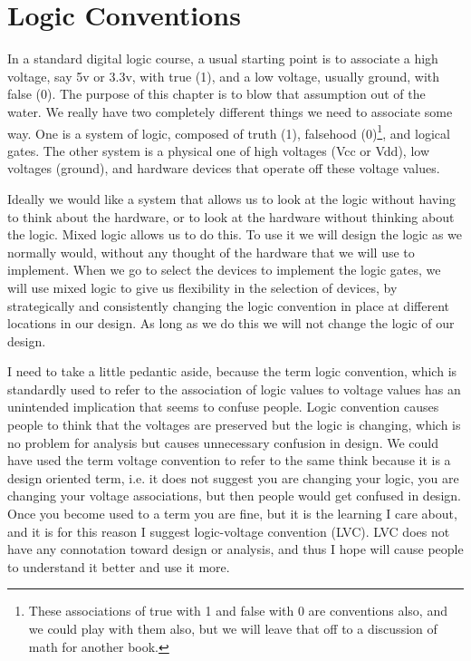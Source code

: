 \chapter{Logic Conventions}

In a standard digital logic course, a usual starting point is to associate a high voltage, say 5v or 3.3v, with true (1), and a low voltage, usually ground, with false (0).  The purpose of this chapter is to blow that assumption out of the water.  We really have two completely different things we need to associate some way.  One is a system of logic, composed of truth (1), falsehood (0)\footnote{These associations of true with 1 and false with 0 are conventions also, and we could play with them also, but we will leave that off to a discussion of math for another book.}, and logical gates.  The other system is a physical one of high voltages (Vcc or Vdd), low voltages (ground), and hardware devices that operate off these voltage values.

Ideally we would like a system that allows us to look at the logic without having to think about the hardware, or to look at the hardware without thinking about the logic.  Mixed logic allows us to do this.  To use it we will design the logic as we normally would, without any thought of the hardware that we will use to implement.  When we go to select the devices to implement the logic gates, we will use mixed logic to give us flexibility in the selection of devices, by strategically and consistently changing the logic convention in place at different locations in our design.  As long as we do this we will not change the logic of our design.

I need to take a little pedantic aside, because the term logic convention, which is standardly used to refer to the association of logic values to voltage values has an unintended implication that seems to confuse people. Logic convention causes people to think that the voltages are preserved but the logic is changing, which is no problem for analysis but causes unnecessary confusion in design.  We could have used the term voltage convention to refer to the same think because it is a design oriented term, i.e. it does not suggest you are changing your logic, you are changing your voltage associations, but then people would get confused in design.  Once you become used to a term you are fine, but it is the learning I care about, and it is for this reason I suggest logic-voltage convention (LVC). LVC does not have any connotation toward design or analysis, and thus I hope will cause people to understand it better and use it more.

